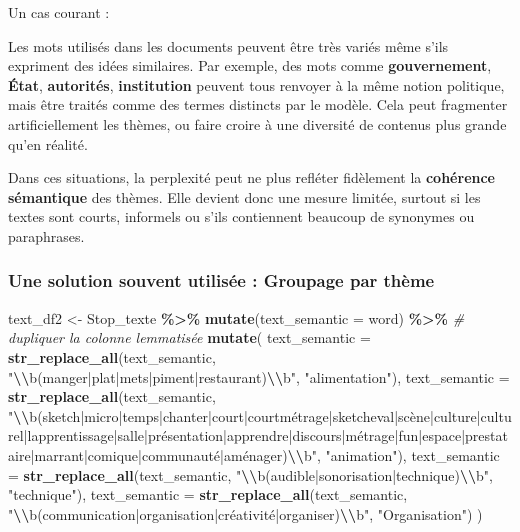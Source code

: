 \documentclass[
]{article}
\newenvironment{Shaded}{\begin{snugshade}}{\end{snugshade}}
\newcommand{\AttributeTok}[1]{\textcolor[rgb]{0.13,0.29,0.53}{#1}}
\newcommand{\CommentTok}[1]{\textcolor[rgb]{0.56,0.35,0.01}{\textit{#1}}}
\newcommand{\FunctionTok}[1]{\textcolor[rgb]{0.13,0.29,0.53}{\textbf{#1}}}
\newcommand{\NormalTok}[1]{#1}
\newcommand{\OtherTok}[1]{\textcolor[rgb]{0.56,0.35,0.01}{#1}}
\newcommand{\SpecialCharTok}[1]{\textcolor[rgb]{0.81,0.36,0.00}{\textbf{#1}}}
\newcommand{\StringTok}[1]{\textcolor[rgb]{0.31,0.60,0.02}{#1}}
\begin{document}
Un cas courant :

Les mots utilisés dans les documents peuvent être très variés même s'ils
expriment des idées similaires. Par exemple, des mots comme
\textbf{gouvernement}, \textbf{État}, \textbf{autorités},
\textbf{institution} peuvent tous renvoyer à la même notion politique,
mais être traités comme des termes distincts par le modèle. Cela peut
fragmenter artificiellement les thèmes, ou faire croire à une diversité
de contenus plus grande qu'en réalité.

Dans ces situations, la perplexité peut ne plus refléter fidèlement la
\textbf{cohérence sémantique} des thèmes. Elle devient donc une mesure
limitée, surtout si les textes sont courts, informels ou s'ils
contiennent beaucoup de synonymes ou paraphrases.

\subsubsection{Une solution souvent utilisée : Groupage par
thème}\label{une-solution-souvent-utilisuxe9e-groupage-par-thuxe8me}

\begin{Shaded}
\begin{Highlighting}[]
\NormalTok{text\_df2 }\OtherTok{\textless{}{-}}\NormalTok{ Stop\_texte }\SpecialCharTok{\%\textgreater{}\%}
  \FunctionTok{mutate}\NormalTok{(}\AttributeTok{text\_semantic =}\NormalTok{ word) }\SpecialCharTok{\%\textgreater{}\%}  \CommentTok{\# dupliquer la colonne lemmatisée}
  \FunctionTok{mutate}\NormalTok{(}
    \AttributeTok{text\_semantic =} \FunctionTok{str\_replace\_all}\NormalTok{(text\_semantic, }\StringTok{"}\SpecialCharTok{\textbackslash{}\textbackslash{}}\StringTok{b(manger|plat|mets|piment|restaurant)}\SpecialCharTok{\textbackslash{}\textbackslash{}}\StringTok{b"}\NormalTok{, }\StringTok{"alimentation"}\NormalTok{),}
    \AttributeTok{text\_semantic =} \FunctionTok{str\_replace\_all}\NormalTok{(text\_semantic, }\StringTok{"}\SpecialCharTok{\textbackslash{}\textbackslash{}}\StringTok{b(sketch|micro|temps|chanter|court|courtmétrage|sketcheval|scène|culture|culturel|lapprentissage|salle|présentation|apprendre|discours|métrage|fun|espace|prestataire|marrant|comique|communauté|aménager)}\SpecialCharTok{\textbackslash{}\textbackslash{}}\StringTok{b"}\NormalTok{, }\StringTok{"animation"}\NormalTok{),}
    \AttributeTok{text\_semantic =} \FunctionTok{str\_replace\_all}\NormalTok{(text\_semantic, }\StringTok{"}\SpecialCharTok{\textbackslash{}\textbackslash{}}\StringTok{b(audible|sonorisation|technique)}\SpecialCharTok{\textbackslash{}\textbackslash{}}\StringTok{b"}\NormalTok{, }\StringTok{"technique"}\NormalTok{),}
    \AttributeTok{text\_semantic =} \FunctionTok{str\_replace\_all}\NormalTok{(text\_semantic, }\StringTok{"}\SpecialCharTok{\textbackslash{}\textbackslash{}}\StringTok{b(communication|organisation|créativité|organiser)}\SpecialCharTok{\textbackslash{}\textbackslash{}}\StringTok{b"}\NormalTok{, }\StringTok{"Organisation"}\NormalTok{)}
\NormalTok{  )}
\end{Highlighting}
\end{Shaded}
\end{document}
